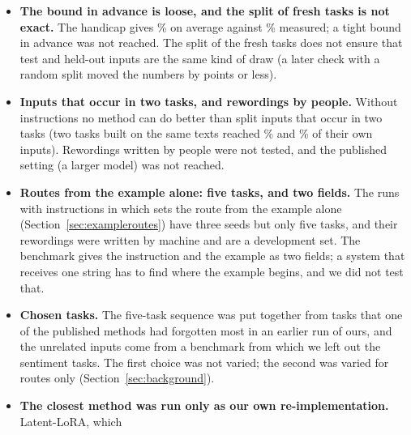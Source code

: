 \begin{itemize}
  tasks, so their numbers there are development numbers (\AudDevLLamOneEnd{}\% of the test inputs at
  their own task after 15 tasks); the five GPU tasks are among them. The numbers on fresh tasks
  (\AudFreshFourthLEnd{}\% on 30 unseen tasks, \AudScaleLongThreeEnd{}\% on the second benchmark,
  \AudScaleAllHundredTwentyEnd{}\% with 120 tasks) are routes only. On fifteen tasks trained answers without instructions exist for our rules only, with one seed
  (Section~\ref{sec:nodeftrained}); there are none on the second benchmark, nor with the published methods given an oracle
  for the task or our recogniser in front.
  \item \textbf{The bound in advance is loose, and the split of fresh tasks is not exact.} The
  handicap gives \AudDevHPrimeTTwoBound{}\% on average against \AudDevHPrimeTTwoChanged{}\% measured; a
  tight bound in advance was not reached. The split of the fresh tasks does not ensure that test and
  held-out inputs are the same kind of draw (a later check with a random split moved the numbers by
  \AudScaleSplitMaxDiffEnd{} points or less).
  \item \textbf{Inputs that occur in two tasks, and rewordings by people.} Without instructions no
  method can do better than split inputs that occur in two tasks (two tasks built on the same texts
  reached \AudScalePairOlderLEnd{}\% and \AudScalePairNewerLEnd{}\% of their own inputs). Rewordings written by people were not
  tested, and the published setting (a larger model) was not reached.
  \item \textbf{Routes from the example alone: five tasks, and two fields.} The runs with
  instructions in which \recog{} sets the route from the example alone
  (Section~\ref{sec:exampleroutes}) have three seeds but only five tasks, and their rewordings were written by
  machine and are a development set. The benchmark gives the instruction and the example as two fields; a system that receives one
  string has to find where the example begins, and we did not test that.
  \item \textbf{Chosen tasks.} The five-task sequence was put together from tasks that one of the
  published methods had forgotten most in an earlier run of ours, and the unrelated inputs come
  from a benchmark from which we left out the sentiment tasks. The first choice was not varied; the
  second was varied for routes only (Section~\ref{sec:background}).
  \item \textbf{The closest method was run only as our own re-implementation.} Latent-LoRA, which

\end{itemize}
